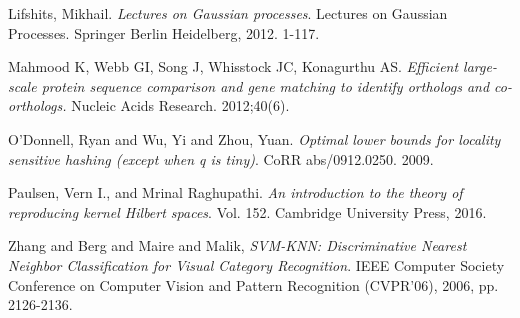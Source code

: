 \documentclass[twoside,11pt]{homework}
\begin{document}
 Lifshits, Mikhail. \emph{Lectures on Gaussian processes}. Lectures on Gaussian Processes. Springer Berlin Heidelberg, 2012. 1-117.

 Mahmood K, Webb GI, Song J, Whisstock JC, Konagurthu AS. \emph{Efficient large-scale protein sequence comparison and gene matching to identify orthologs and co-orthologs.} Nucleic Acids Research. 2012;40(6).

 O'Donnell, Ryan and Wu, Yi and Zhou, Yuan. \emph{Optimal lower bounds for locality sensitive hashing (except when q is tiny)}. CoRR abs/0912.0250.  2009. 

 Paulsen, Vern I., and Mrinal Raghupathi. \emph{An introduction to the theory of reproducing kernel Hilbert spaces}. Vol. 152. Cambridge University Press, 2016. 

 Zhang and Berg and Maire and Malik, \emph{SVM-KNN: Discriminative Nearest Neighbor Classification for Visual Category Recognition}. IEEE Computer Society Conference on Computer Vision and Pattern Recognition (CVPR'06), 2006, pp. 2126-2136.


\endrefs
\end{document}
